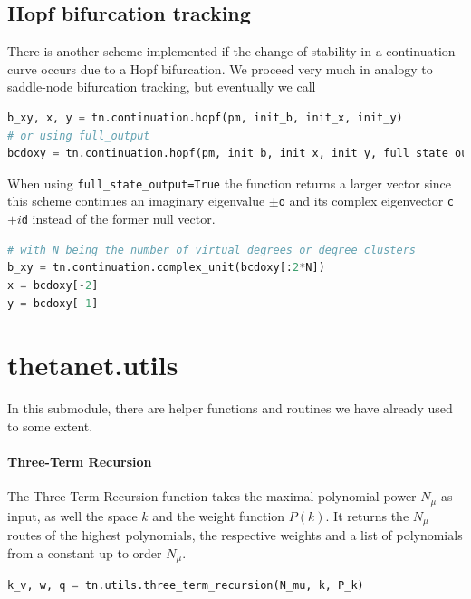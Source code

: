 \documentclass[bibliography=totoc, twoside]{article}
\numberwithin{equation}{section}
\begin{document}
\subsection{Hopf bifurcation tracking}
There is another scheme implemented if the change of stability in a continuation curve occurs due to a Hopf bifurcation.
We proceed very much in analogy to saddle-node bifurcation tracking, but eventually we call
\begin{lstlisting}[language=python]
b_xy, x, y = tn.continuation.hopf(pm, init_b, init_x, init_y)
# or using full_output
bcdoxy = tn.continuation.hopf(pm, init_b, init_x, init_y, full_state_output=True)
\end{lstlisting}
When using \texttt{full\_state\_output=True} the function returns a larger vector since this scheme continues an imaginary eigenvalue $\pm$\texttt{o} and its complex eigenvector \texttt{c}$+ i$\texttt{d} instead of the former null vector.
\begin{lstlisting}[language=python]
# with N being the number of virtual degrees or degree clusters
b_xy = tn.continuation.complex_unit(bcdoxy[:2*N])
x = bcdoxy[-2]
y = bcdoxy[-1]
\end{lstlisting}


\section{thetanet.utils}
In this submodule, there are helper functions and routines we have already used to some extent.
\paragraph*{Three-Term Recursion}
The Three-Term Recursion function takes the maximal polynomial power $N_{\mu}$ as input, as well the space $k$ and the weight function $P(k)$.
It returns the $N_{\mu}$ routes of the highest polynomials, the respective weights and a list of polynomials from a constant up to order $N_{\mu}$.
\begin{lstlisting}[language=python]
k_v, w, q = tn.utils.three_term_recursion(N_mu, k, P_k)
\end{lstlisting}
\end{document}
